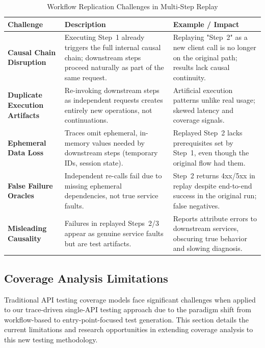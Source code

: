 \documentclass[conference]{IEEEtran}
\begin{document}
\begin{table}[t]
\centering
\caption{Workflow Replication Challenges in Multi-Step Replay}
\label{tab:workflow-challenges}
\renewcommand{\arraystretch}{1.2}
\setlength{\tabcolsep}{6pt}
\begin{tabularx}{\textwidth}{>{\bfseries}p{} X p{}}
\toprule
Challenge & Description & Example / Impact \\
\midrule
Causal Chain Disruption & Executing Step~1 already triggers the full internal causal chain; downstream steps proceed naturally as part of the same request. & Replaying "Step~2" as a new client call is no longer on the original path; results lack causal continuity. \\
Duplicate Execution Artifacts & Re-invoking downstream steps as independent requests creates entirely new operations, not continuations. & Artificial execution patterns unlike real usage; skewed latency and coverage signals. \\
Ephemeral Data Loss & Traces omit ephemeral, in-memory values needed by downstream steps (temporary IDs, session state). & Replayed Step~2 lacks prerequisites set by Step~1, even though the original flow had them. \\
False Failure Oracles & Independent re-calls fail due to missing ephemeral dependencies, not true service faults. & Step~2 returns 4xx/5xx in replay despite end-to-end success in the original run; false negatives. \\
Misleading Causality & Failures in replayed Steps~2/3 appear as genuine service faults but are test artifacts. & Reports attribute errors to downstream services, obscuring true behavior and slowing diagnosis. \\
\bottomrule
\end{tabularx}
\end{table}

\subsection{Coverage Analysis Limitations}\label{sec:coverage-limitations}

Traditional API testing coverage models face significant challenges when applied to our trace-driven single-API testing approach due to the paradigm shift from workflow-based to entry-point-focused test generation. This section details the current limitations and research opportunities in extending coverage analysis to this new testing methodology.
\end{document}
